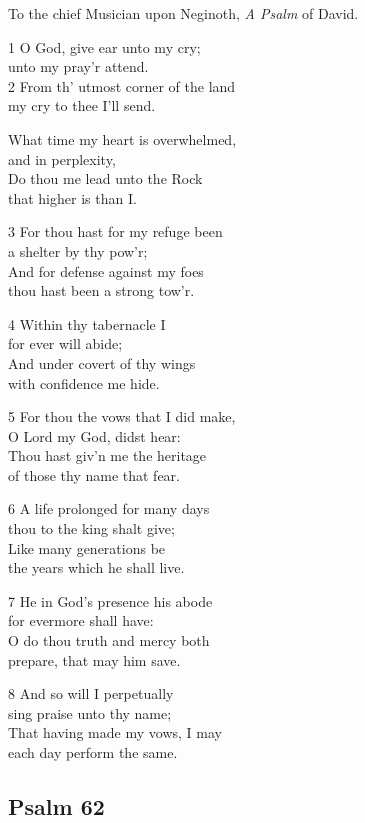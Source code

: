 \begin{multicols}{3}
To the chief Musician upon Neginoth,
\emph{A Psalm} of David.

1 O God, give ear unto my cry;\\
unto my pray’r attend.\\
2 From th’ utmost corner of the land\\
my cry to thee I’ll send.

What time my heart is overwhelmed,\\
and in perplexity,\\
Do thou me lead unto the Rock\\
that higher is than I.

3 For thou hast for my refuge been\\
a shelter by thy pow’r;\\
And for defense against my foes\\
thou hast been a strong tow’r.

4 Within thy tabernacle I\\
for ever will abide;\\
And under covert of thy wings\\
with confidence me hide.

5 For thou the vows that I did make,\\
O Lord my God, didst hear:\\
Thou hast giv’n me the heritage\\
of those thy name that fear.

6 A life prolonged for many days\\
thou to the king shalt give;\\
Like many generations be\\
the years which he shall live.

7 He in God’s presence his abode\\
for evermore shall have:\\
O do thou truth and mercy both\\
prepare, that may him save.

8 And so will I perpetually\\
sing praise unto thy name;\\
That having made my vows, I may\\
each day perform the same.

\begin{center}
\quad{}\quad{}
\end{center}

\subsection*{Psalm 62}


\end{multicols}
